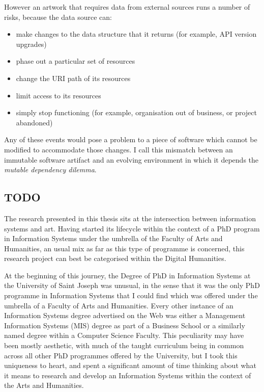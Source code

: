 However an artwork that requires data from external sources runs a number of risks, because the data source can:

\begin{itemize}
    \item make changes to the data structure that it returns (for example, API version upgrades)
    \item phase out a particular set of resources
    \item change the URI path of its resources
    \item limit access to its resources
    \item simply stop functioning (for example, organisation out of business, or project abandoned)
\end{itemize}

Any of these events would pose a problem to a piece of software which cannot be modified to accommodate those changes. I call this mismatch between an immutable software artifact and an evolving environment in which it depends the \emph{mutable dependency dilemma}.









\subsection{TODO}


The research presented in this thesis sits at the intersection between information systems and art. Having started its lifecycle within the context of a PhD program in Information Systems under the umbrella of the Faculty of Arts and Humanities, an usual mix as far as this type of programme is concerned, this research project can best be categorised within the Digital Humanities. 

At the beginning of this journey, the Degree of PhD in Information Systems at the University of Saint Joseph was unusual, in the sense that it was the only PhD programme in Information Systems that I could find which was offered under the umbrella of a Faculty of Arts and Humanities. Every other instance of an Information Systems degree advertised on the Web was either a Management Information Systems (MIS) degree as part of a Business School or a similarly named degree within a Computer Science Faculty. This peculiarity may have been mostly aesthetic, with much of the taught curriculum being in common across all other PhD programmes offered by the University, but I took this uniqueness to heart, and spent a significant amount of time thinking about what it means to research and develop an Information Systems within the context of the Arts and Humanities.

